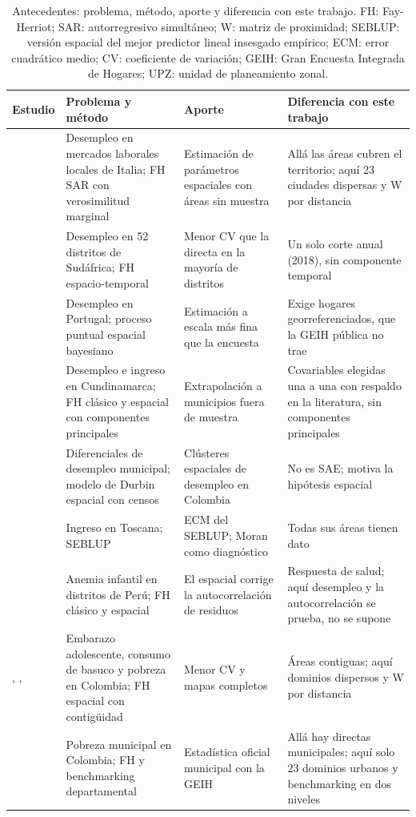 \begin{table}[!htbp]
\centering
\footnotesize
\caption{Antecedentes: problema, método, aporte y diferencia con este trabajo. FH: Fay-Herriot; SAR: autorregresivo simultáneo; W: matriz de proximidad; SEBLUP: versión espacial del mejor predictor lineal insesgado empírico; ECM: error cuadrático medio; CV: coeficiente de variación; GEIH: Gran Encuesta Integrada de Hogares; UPZ: unidad de planeamiento zonal.}
\label{tab:antecedentes}
\renewcommand{\arraystretch}{1.0}
\begin{tabularx}{\linewidth}{>{\raggedright\arraybackslash}p{2.4cm} >{\raggedright\arraybackslash}p{3.0cm} >{\raggedright\arraybackslash}X >{\raggedright\arraybackslash}X}
\toprule
Estudio & Problema y método & Aporte & Diferencia con este trabajo \\
\midrule
\cite{Benedetti2024} & Desempleo en mercados laborales locales de Italia; FH SAR con verosimilitud marginal & Estimación de parámetros espaciales con áreas sin muestra & Allá las áreas cubren el territorio; aquí 23 ciudades dispersas y W por distancia \\
\cite{Shiferaw2025} & Desempleo en 52 distritos de Sudáfrica; FH espacio-temporal & Menor CV que la directa en la mayoría de distritos & Un solo corte anual (2018), sin componente temporal \\
\cite{Pereira2021} & Desempleo en Portugal; proceso puntual espacial bayesiano & Estimación a escala más fina que la encuesta & Exige hogares georreferenciados, que la GEIH pública no trae \\
\cite{MendozaZea2019} & Desempleo e ingreso en Cundinamarca; FH clásico y espacial con componentes principales & Extrapolación a municipios fuera de muestra & Covariables elegidas una a una con respaldo en la literatura, sin componentes principales \\
\cite{Diaz2016} & Diferenciales de desempleo municipal; modelo de Durbin espacial con censos & Clústeres espaciales de desempleo en Colombia & No es SAE; motiva la hipótesis espacial \\
\cite{PratesiSalvati2008} & Ingreso en Toscana; SEBLUP & ECM del SEBLUP; Moran como diagnóstico & Todas sus áreas tienen dato \\
\cite{Sikov2023} & Anemia infantil en distritos de Perú; FH clásico y espacial & El espacial corrige la autocorrelación de residuos & Respuesta de salud; aquí desempleo y la autocorrelación se prueba, no se supone \\
\cite{RomeroLemus2018}, \cite{VargasLemusAlejo2018}, \cite{Duran2024} & Embarazo adolescente, consumo de basuco y pobreza en Colombia; FH espacial con contigüidad & Menor CV y mapas completos & Áreas contiguas; aquí dominios dispersos y W por distancia \\
\cite{DANE_SAE_2025} & Pobreza municipal en Colombia; FH y benchmarking departamental & Estadística oficial municipal con la GEIH & Allá hay directas municipales; aquí solo 23 dominios urbanos y benchmarking en dos niveles \\
\bottomrule
\end{tabularx}
\end{table}

